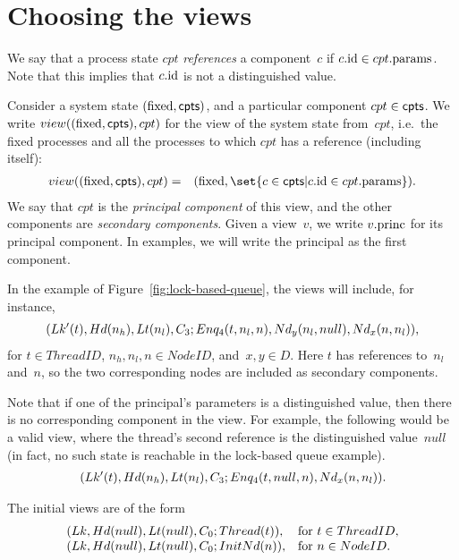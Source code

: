 
\section{Choosing the views}

We say that a process state $cpt$ \emph{references} a component~$c$ if $c.\mathrm{id}
\in cpt.\mathrm{params}$.  Note that this implies that $c.\mathrm{id}$ is not a distinguished
value.

Consider a system state $(\mathrm{fixed}, \mathsf{cpts})$, and a particular component $cpt
\in \mathsf{cpts}$.  We write $view((\mathrm{fixed}, \mathsf{cpts}), cpt)$ for the view of the system
state from~$cpt$, i.e.~the fixed processes and all the processes to which
$cpt$ has a reference (including itself):
%
%
\begin{eqnarray*}
view((\fixed, \cpt), cpt) & = &
  (\fixed, \set{c \in \cpts | c.\id \in cpt.\params}).
\end{eqnarray*}
%
We say that $cpt$ is the \emph{principal component} of this view, and the
other components are \emph{secondary components}.  Given a view~$v$, we write
$v.\mathrm{princ}$ for its principal component.  In examples, we will write the
principal as the first component. 

In the example of Figure~\ref{fig:lock-based-queue}, the views will include,
for instance,
\[
\begin{align}
(Lk'(t), Hd(n_h), Lt(n_l), C_3; 
  Enq_4(t, n_l, n), Nd_y(n_l, null),Nd_x(n, n_l)),
\end{align}
\]
for $t \in ThreadID$, $n_h, n_l, n \in NodeID$, and~$x, y \in D$.  Here $t$
has references to~$n_l$ and~$n$, so the two corresponding nodes are included
as secondary components.

Note that if one of the principal's parameters is a distinguished value, then
there is no corresponding component in the view.  For example, the following
would be a valid view, where the thread's second reference is the
distinguished value~$null$ (in fact, no such state is reachable in the
lock-based queue example).
\[
\begin{align}
(Lk'(t), Hd(n_h), Lt(n_l), C_3;   Enq_4(t, null, n), Nd_x(n, n_l)).
\end{align}
\]

%
The initial views are of the form
\[
\begin{array}{ll}
(Lk, Hd(null), Lt(null), C_0; Thread(t)), &
   \mbox{for $t \in ThreadID$}, \\
(Lk, Hd(null), Lt(null), C_0; InitNd(n)), & 
   \mbox{for $n \in NodeID$}.
\end{array}
\]

